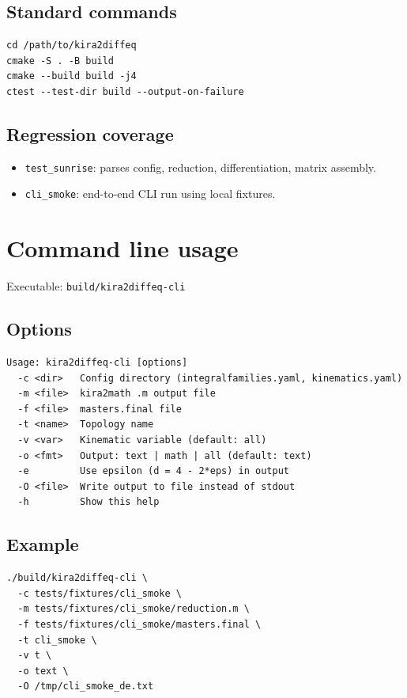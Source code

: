 \documentclass[11pt,openany]{report}
\newcommand{\code}[1]{\texttt{#1}}
\begin{document}
\section{Standard commands}
\begin{verbatim}
cd /path/to/kira2diffeq
cmake -S . -B build
cmake --build build -j4
ctest --test-dir build --output-on-failure
\end{verbatim}

\section{Regression coverage}
\begin{itemize}
  \item \texttt{test\_sunrise}: parses config, reduction, differentiation, matrix assembly.
  \item \texttt{cli\_smoke}: end-to-end CLI run using local fixtures.
\end{itemize}

\chapter{Command line usage}

Executable: \code{build/kira2diffeq-cli}

\section{Options}
\begin{verbatim}
Usage: kira2diffeq-cli [options]
  -c <dir>   Config directory (integralfamilies.yaml, kinematics.yaml)
  -m <file>  kira2math .m output file
  -f <file>  masters.final file
  -t <name>  Topology name
  -v <var>   Kinematic variable (default: all)
  -o <fmt>   Output: text | math | all (default: text)
  -e         Use epsilon (d = 4 - 2*eps) in output
  -O <file>  Write output to file instead of stdout
  -h         Show this help
\end{verbatim}

\section{Example}
\begin{verbatim}
./build/kira2diffeq-cli \
  -c tests/fixtures/cli_smoke \
  -m tests/fixtures/cli_smoke/reduction.m \
  -f tests/fixtures/cli_smoke/masters.final \
  -t cli_smoke \
  -v t \
  -o text \
  -O /tmp/cli_smoke_de.txt
\end{verbatim}
\end{document}
